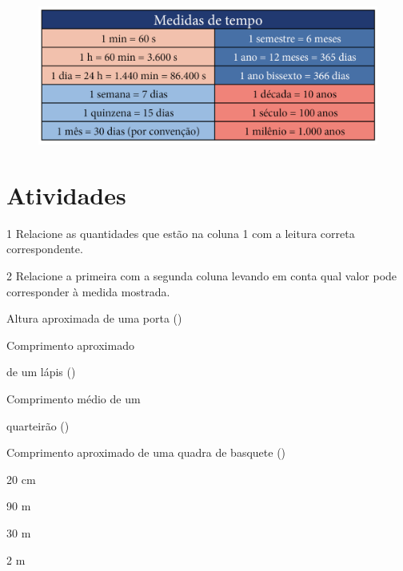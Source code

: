 \begin{figure}[htpb!]
\includegraphics[width=\textwidth]{../ilustracoes/MAT5/SAEB_5ANO_MAT_figura30_2.png}
\end{figure}

\section*{Atividades}

\num{1} Relacione as quantidades que estão na coluna 1 com a leitura correta correspondente.

\begin{multicols}{2}







\end{multicols}



\num{2} Relacione a primeira com a segunda coluna levando em conta qual
valor pode corresponder à medida mostrada.

\begin{multicols}{2}

\noindent{}Altura aproximada de uma porta ({})

\noindent{}Comprimento aproximado

\noindent{}de um lápis ({\rosa{20 cm}})

\noindent{}Comprimento médio de um

\noindent{} quarteirão ({})

\noindent{}Comprimento aproximado de uma quadra de basquete ({})

\columnbreak

20 cm
 
90 m

30 m
 
2 m
\end{multicols}

